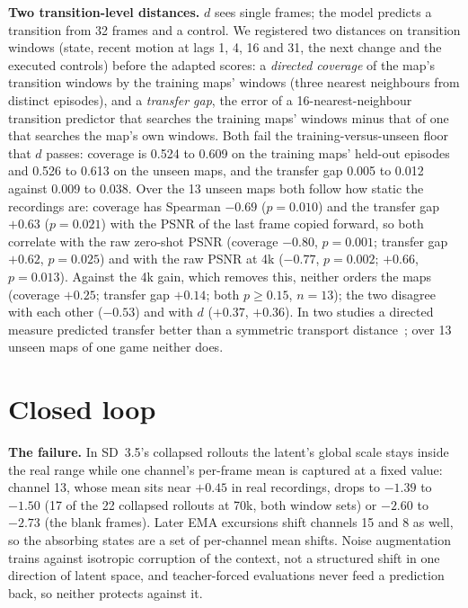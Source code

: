 \textbf{Two transition-level distances.} $d$ sees single frames; the model predicts a transition from 32 frames and a control. We registered two distances on transition windows (state, recent motion at lags 1, 4, 16 and 31, the next change and the executed controls) before the adapted scores: a \emph{directed coverage} of the map's transition windows by the training maps' windows (three nearest neighbours from distinct episodes), and a \emph{transfer gap}, the error of a 16-nearest-neighbour transition predictor that searches the training maps' windows minus that of one that searches the map's own windows. Both fail the training-versus-unseen floor that $d$ passes: coverage is 0.524 to 0.609 on the training maps' held-out episodes and 0.526 to 0.613 on the unseen maps, and the transfer gap 0.005 to 0.012 against 0.009 to 0.038. Over the 13 unseen maps both follow how static the recordings are: coverage has Spearman $-0.69$ ($p=0.010$) and the transfer gap $+0.63$ ($p=0.021$) with the PSNR of the last frame copied forward, so both correlate with the raw zero-shot PSNR (coverage $-0.80$, $p=0.001$; transfer gap $+0.62$, $p=0.025$) and with the raw PSNR at 4k ($-0.77$, $p=0.002$; $+0.66$, $p=0.013$). Against the 4k gain, which removes this, neither orders the maps (coverage $+0.25$; transfer gap $+0.14$; both $p\ge0.15$, $n=13$); the two disagree with each other ($-0.53$) and with $d$ ($+0.37$, $+0.36$). In two studies a directed measure predicted transfer better than a symmetric transport distance~\citep{mensink2021factors,westny2026latent}; over 13 unseen maps of one game neither does.

\section{Closed loop}
\label{app:closedloop}

\textbf{The failure.} In SD~3.5's collapsed rollouts the latent's global scale stays inside the real range while one channel's per-frame mean is captured at a fixed value: channel 13, whose mean sits near $+0.45$ in real recordings, drops to $-1.39$ to $-1.50$ (17 of the 22 collapsed rollouts at 70k, both window sets) or $-2.60$ to $-2.73$ (the blank frames). Later EMA excursions shift channels 15 and 8 as well, so the absorbing states are a set of per-channel mean shifts. Noise augmentation trains against isotropic corruption of the context, not a structured shift in one direction of latent space, and teacher-forced evaluations never feed a prediction back, so neither protects against it.

